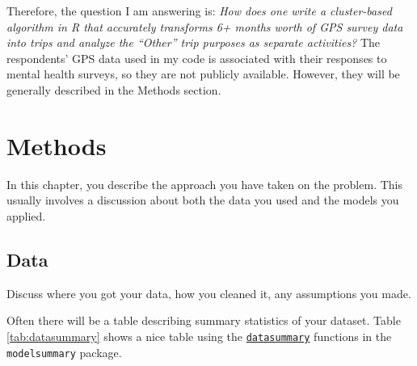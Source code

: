 \documentclass[3p, authoryear]{elsarticle} %
\begin{document}
Therefore, the question I am answering is: \emph{How does one write a cluster-based algorithm in R that accurately transforms 6+ months worth of GPS survey data into trips and analyze the ``Other'' trip purposes as separate activities?} The respondents' GPS data used in my code is associated with their responses to mental health surveys, so they are not publicly available. However, they will be generally described in the Methods section.

\hypertarget{methods}{%
\section{Methods}\label{methods}}

In this chapter, you describe the approach you have taken on the problem. This
usually involves a discussion about both the data you used and the models you
applied.

\hypertarget{data}{%
\subsection{Data}\label{data}}

Discuss where you got your data, how you cleaned it, any assumptions you made.

Often there will be a table describing summary statistics of your dataset.
Table \ref{tab:datasummary} shows a nice table using the \href{https://vincentarelbundock.github.io/modelsummary/articles/datasummary.html}{\texttt{datasummary}}
functions in the \texttt{modelsummary} package.
\end{document}
